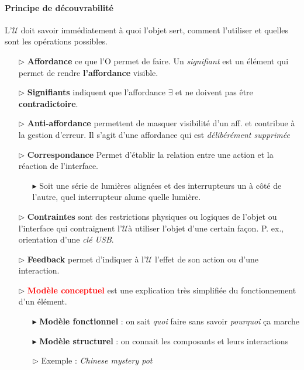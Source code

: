 \documentclass{report}
\begin{document}
\begin{multicols*}{3}
    \paragraph{Principe de découvrabilité}
    L'$\mathcal{U}$ doit savoir immédiatement à quoi l'objet sert, comment 
    l'utiliser et quelles sont les opérations possibles. 

    \begin{itemize}
      \item [$\rhd $]  \textbf{Affordance} ce que l'O permet de faire.  
            Un \textit{signifiant} est un élément qui permet de rendre 
            \textbf{l'affordance} visible.   

      \item [$\rhd $]  \textbf{Signifiants} indiquent que l'affordance 
        $\exists$ et ne doivent pas être \textbf{contradictoire}.   

      \item [$\rhd $]  \textbf{Anti-affordance} permettent de masquer 
        visibilité d'un aff. et contribue à la gestion d'erreur. 
        Il s'agit d'une affordance qui est \textit{délibérément supprimée}

      \item [$\rhd $]   \textbf{Correspondance} Permet d'établir la relation entre une action 
        et la réaction de l'interface. 
        \begin{itemize}
          \item [$\blacktriangleright$] Soit une série de lumières alignées et des interrupteurs un à côté 
            de l'autre, quel interrupteur alume quelle lumière. 
        \end{itemize}
        
        \item [$\rhd$ ] \textbf{Contraintes}  
          sont des restrictions physiques ou logiques de l'objet ou l'interface 
          qui contraignent l'$\mathcal{U}$à utiliser l'objet d'une certain façon. 
          P. ex., orientation d'une \textit{clé USB}.   

        \item [$\rhd$ ] \textbf{Feedback} permet d'indiquer à l'$\mathcal{U}$     
          l'effet de son action ou d'une interaction. 

        \item [$\rhd$ ] \textbf{\textcolor{red}{Modèle conceptuel}}
          est une explication très simplifiée 
          du fonctionnement d'un élément. 
          \begin{itemize}
            \item [$\blacktriangleright$ ] \textbf{Modèle fonctionnel} : on sait \textit{quoi} 
              faire sans savoir \textit{pourquoi} ça marche       
            \item [$\blacktriangleright$ ] \textbf{Modèle structurel} : on connait 
              les composants et leurs interactions
            \item[ $\rhd$] Exemple : \textit{Chinese mystery pot}  
          \end{itemize}
        

\end{itemize}
\end{multicols*}
\end{document}
